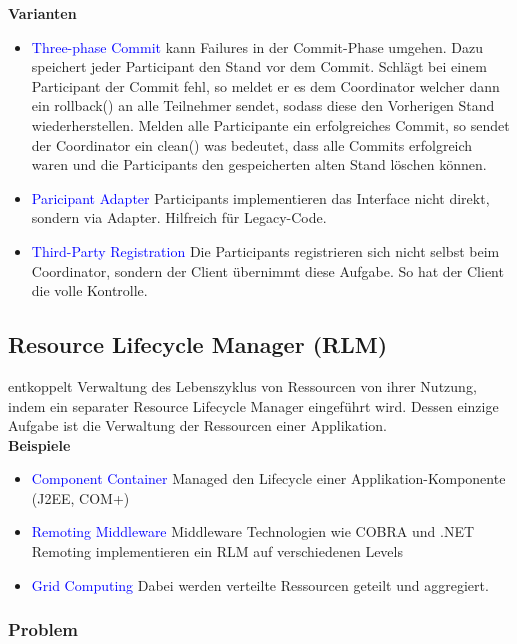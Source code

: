 \textbf{Varianten}

\begin{itemize}
    \item \textcolor{blue}{Three-phase Commit} kann Failures in der Commit-Phase umgehen. Dazu speichert jeder Participant den Stand vor dem Commit. Schlägt bei einem Participant der Commit fehl, so meldet er es dem Coordinator welcher dann ein rollback() an alle Teilnehmer sendet, sodass diese den Vorherigen Stand wiederherstellen. Melden alle Participante ein erfolgreiches Commit, so sendet der Coordinator ein clean() was bedeutet, dass alle Commits erfolgreich waren und die Participants den gespeicherten alten Stand löschen können.
    \item \textcolor{blue}{Paricipant Adapter} Participants implementieren das Interface nicht direkt, sondern via Adapter. Hilfreich für Legacy-Code.
    \item \textcolor{blue}{Third-Party Registration} Die Participants registrieren sich nicht selbst beim Coordinator, sondern der Client übernimmt diese Aufgabe. So hat der Client die volle Kontrolle.
\end{itemize}

\subsection{Resource Lifecycle Manager (RLM)}

entkoppelt Verwaltung des Lebenszyklus von Ressourcen von ihrer Nutzung, indem ein separater Resource Lifecycle Manager eingeführt wird. Dessen einzige Aufgabe ist die Verwaltung der Ressourcen einer Applikation. \\

\textbf{Beispiele}

\begin{itemize}
    \item \textcolor{blue}{Component Container} Managed den Lifecycle einer Applikation-Komponente (J2EE, COM+)
    \item \textcolor{blue}{Remoting Middleware} Middleware Technologien wie COBRA und .NET Remoting implementieren ein RLM auf verschiedenen Levels
    \item \textcolor{blue}{Grid Computing} Dabei werden verteilte Ressourcen geteilt und aggregiert.
\end{itemize}

\subsubsection{Problem}

